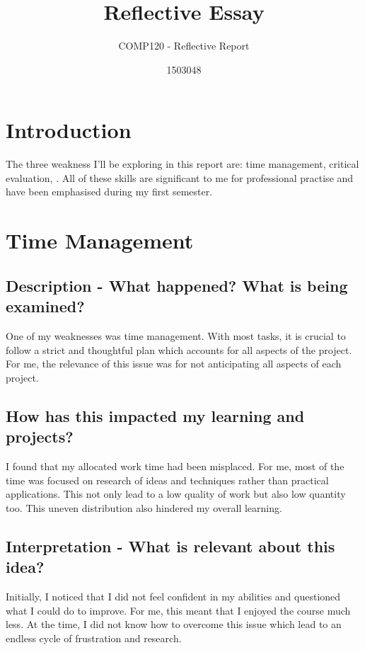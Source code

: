 \documentclass{scrartcl}
\title{Reflective Essay}
\subtitle{COMP120 - Reflective Report}
\author{1503048}
\begin{document}
\maketitle


\section{Introduction}

The three weakness I'll be exploring in this report are: time management, critical evaluation, . All of these skills are significant to me for professional practise and have been emphasised during my first semester.

\section{Time Management}

\subsection{Description - What happened? What is being examined?}

One of my weaknesses was time management. With most tasks, it is crucial to follow a strict and thoughtful plan which accounts for all aspects of the project. For me, the relevance of this issue was for not anticipating all aspects of each project.

\subsection{How has this impacted my learning and projects?}

I found that my allocated work time had been misplaced. For me, most of the time was focused on research of ideas and techniques rather than practical applications. This not only lead to a low quality of work but also low quantity too. This uneven distribution also hindered my overall learning.


\subsection{Interpretation - What is relevant about this idea?}

Initially, I noticed that I did not feel confident in my abilities and questioned what I could do to improve. For me, this meant that I enjoyed the course much less. At the time, I did not know how to overcome this issue which lead to an endless cycle of frustration and research.
\end{document}
